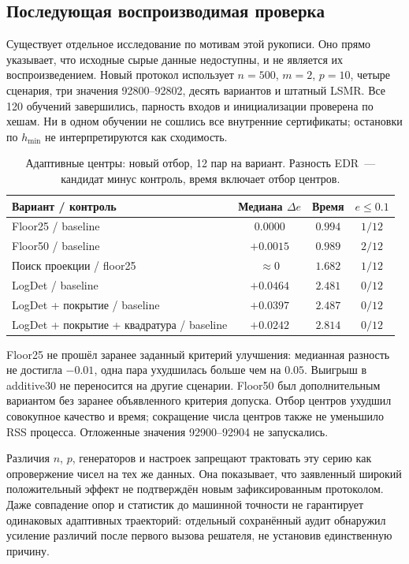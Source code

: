 \documentclass[11pt,a4paper]{article}
\numberwithin{equation}{section}
\begin{document}
\subsection{Последующая воспроизводимая проверка}

Существует отдельное исследование по мотивам этой рукописи.
Оно прямо указывает, что исходные сырые данные недоступны,
и не является их воспроизведением. Новый протокол использует
$n=500$, $m=2$, $p=10$, четыре сценария, три значения
92800--92802, десять вариантов и штатный LSMR.
Все 120 обучений завершились, парность входов и инициализации
проверена по хешам. Ни в одном обучении не сошлись все внутренние
сертификаты; остановки по $h_{\min}$ не интерпретируются как сходимость.

\begin{table}[htbp]
\centering\small
\caption{Адаптивные центры: новый отбор, 12 пар на вариант.
Разность EDR~--- кандидат минус контроль, время включает отбор центров.}
\label{tab:centers}
\begin{tabularx}{\linewidth}{@{}Xccc@{}}
\toprule
Вариант / контроль & Медиана $\Delta e$ & Время & $e\le0.1$\\
\midrule
Floor25 / baseline & $0.0000$ & $0.994$ & $1/12$\\
Floor50 / baseline & $+0.0015$ & $0.989$ & $2/12$\\
Поиск проекции / floor25 & $\approx0$ & $1.682$ & $1/12$\\
LogDet / baseline & $+0.0464$ & $2.481$ & $0/12$\\
LogDet + покрытие / baseline & $+0.0397$ & $2.487$ & $0/12$\\
LogDet + покрытие + квадратура / baseline & $+0.0242$ & $2.814$ & $0/12$\\
\bottomrule
\end{tabularx}
\end{table}

Floor25 не прошёл заранее заданный критерий улучшения:
медианная разность не достигла $-0.01$, одна пара ухудшилась
больше чем на $0.05$. Выигрыш в additive30 не переносится
на другие сценарии. Floor50 был дополнительным вариантом без
заранее объявленного критерия допуска. Отбор центров ухудшил
совокупное качество и время; сокращение числа центров также
не уменьшило RSS процесса. Отложенные значения 92900--92904
не запускались.

Различия $n$, $p$, генераторов и настроек запрещают трактовать
эту серию как опровержение чисел на тех же данных.
Она показывает, что заявленный широкий положительный эффект
не подтверждён новым зафиксированным протоколом.
Даже совпадение опор и статистик до машинной точности не гарантирует
одинаковых адаптивных траекторий: отдельный сохранённый аудит
обнаружил усиление различий после первого вызова решателя,
не установив единственную причину.\cite{centersreport,centersprotocol}
\end{document}
